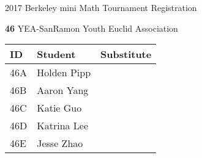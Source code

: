 \documentclass[12pt]{amsart}
\begin{document}
\newpage



\renewcommand{\TeamID}{46}
\renewcommand{\TeamName}{YEA-SanRamon}
\renewcommand{\SchoolName}{Youth Euclid Association}
\renewcommand{\IDA}{46A}
\renewcommand{\IDB}{46B}
\renewcommand{\IDC}{46C}
\renewcommand{\IDD}{46D}
\renewcommand{\IDE}{46E}
\renewcommand{\StudentA}{Holden Pipp}
\renewcommand{\StudentB}{Aaron Yang}
\renewcommand{\StudentC}{Katie Guo}
\renewcommand{\StudentD}{Katrina Lee}
\renewcommand{\StudentE}{Jesse Zhao}

\begin{center}
{\sc \Large 2017 Berkeley mini Math Tournament Registration}

\bigskip
\bigskip

{\bf \Large  \TeamID} \hfill {\large \TeamName} \hfill {\large \SchoolName}

\bigskip
\bigskip

\begin{tabular}{| p{} | p{} | p{} |}
\hline
\bf ID         & \bf Student             & \bf Substitute             \\ \hline
\IDA           & \StudentA               &                            \\ \hline
\IDB           & \StudentB               &                            \\ \hline
\IDC           & \StudentC               &                            \\ \hline
\IDD           & \StudentD               &                            \\ \hline
\IDE           & \StudentE               &                            \\ \hline
\end{tabular} 
\end{center}
\bigskip
\bigskip

\newpage



\renewcommand{\TeamID}{47}
\renewcommand{\TeamName}{YEA-Youth}
\renewcommand{\SchoolName}{Youth Euclid Association}
\renewcommand{\IDA}{47A}
\renewcommand{\IDB}{47B}
\renewcommand{\IDC}{47C}
\renewcommand{\IDD}{47D}
\renewcommand{\IDE}{47E}
\renewcommand{\StudentA}{Harry Zhang}
\renewcommand{\StudentB}{Gore Fee}
\renewcommand{\StudentC}{Franklin Yang}
\renewcommand{\StudentD}{William Zhao}
\renewcommand{\StudentE}{Angela Zhang}
\end{document}

